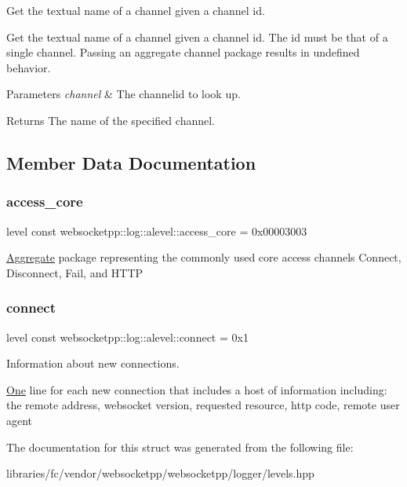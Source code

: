 Get the textual name of a channel given a channel id. 

Get the textual name of a channel given a channel id. The id must be that of a single channel. Passing an aggregate channel package results in undefined behavior.


\begin{DoxyParams}{Parameters}
{\em channel} & The channelid to look up.\\
\hline
\end{DoxyParams}
\begin{DoxyReturn}{Returns}
The name of the specified channel. 
\end{DoxyReturn}


\subsection{Member Data Documentation}
\mbox{\label{structwebsocketpp_1_1log_1_1alevel_af5fdb4de43a77cacb4c3a5b01b816750}} 
\subsubsection{\texorpdfstring{access\+\_\+core}{access\_core}}
{\footnotesize\ttfamily level const websocketpp\+::log\+::alevel\+::access\+\_\+core = 0x00003003\hspace{0.3cm}{\ttfamily [static]}}

\mbox{\hyperlink{struct_aggregate}{Aggregate}} package representing the commonly used core access channels Connect, Disconnect, Fail, and H\+T\+TP \mbox{\label{structwebsocketpp_1_1log_1_1alevel_aac3e16b6df297567ba2533233d477d57}} 
\subsubsection{\texorpdfstring{connect}{connect}}
{\footnotesize\ttfamily level const websocketpp\+::log\+::alevel\+::connect = 0x1\hspace{0.3cm}{\ttfamily [static]}}



Information about new connections. 

\mbox{\hyperlink{struct_one}{One}} line for each new connection that includes a host of information including\+: the remote address, websocket version, requested resource, http code, remote user agent 

The documentation for this struct was generated from the following file\+:\begin{DoxyCompactItemize}
\item 
libraries/fc/vendor/websocketpp/websocketpp/logger/levels.\+hpp\end{DoxyCompactItemize}
